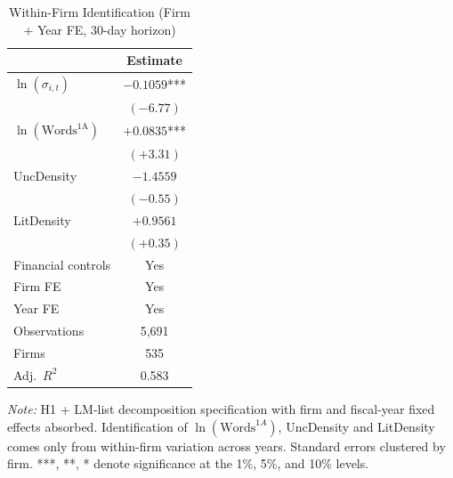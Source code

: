 \begin{table}[htbp]
\centering
\caption{Within-Firm Identification (Firm $+$ Year FE, 30-day horizon)}
\label{tab:firm_fe}
\begin{tabular}{lc}
\toprule
 & Estimate \\
\midrule
$\ln(\sigma_{i,t})$ & $-0.1059$*** \\
 & $(-6.77)$ \\[4pt]
$\ln(\text{Words}^{\text{1A}})$ & $+0.0835$*** \\
 & $(+3.31)$ \\[4pt]
UncDensity & $-1.4559$ \\
 & $(-0.55)$ \\[4pt]
LitDensity & $+0.9561$ \\
 & $(+0.35)$ \\[4pt]
\midrule
Financial controls & Yes \\
Firm FE & Yes \\
Year FE & Yes \\
Observations & 5,691 \\
Firms & 535 \\
Adj.\ $R^2$ & 0.583 \\
\bottomrule
\end{tabular}
\par\smallskip
\begin{flushleft}\footnotesize
\textit{Note:} H1 + LM-list decomposition specification with firm and fiscal-year fixed effects absorbed. Identification of $\ln(\text{Words}^{1A})$, UncDensity and LitDensity comes only from within-firm variation across years. Standard errors clustered by firm. ***, **, * denote significance at the 1\%, 5\%, and 10\% levels.
\end{flushleft}
\end{table}